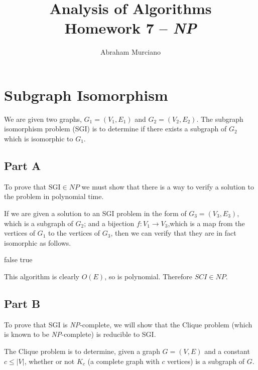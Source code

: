 \documentclass{article}
\title{Analysis of Algorithms \\
\medskip
\large Homework 7 -- \textit{NP}}
\author{Abraham Murciano}
\begin{document}
\maketitle

\section{Subgraph Isomorphism}

We are given two graphs, \(G_1 = (V_1, E_1)\) and \(G_2 = (V_2, E_2)\). The subgraph isomorphism problem (SGI) is to determine if there exists a subgraph of \(G_2\) which is isomorphic to \(G_1\).

\subsection*{Part A}

To prove that \(\text{SGI} \in \mathit{NP}\) we must show that there is a way to verify a solution to the problem in polynomial time.

If we are given a solution to an SGI problem in the form of \(G_3 = (V_3, E_3)\), which is a subgraph of \(G_2\); and a bijection \(f : V_1 \to V_3\),which is a map from the vertices of \(G_1\) to the vertices of \(G_3\), then we can verify that they are in fact isomorphic as follows.

\begin{algorithm}
	\begin{algorithmic}
		\Return false
		\EndIf
		\EndFor
		\State \Return true
		\EndFunction
	\end{algorithmic}
\end{algorithm}

This algorithm is clearly \(O(E)\), so is polynomial. Therefore \(\mathit{SCI} \in \mathit{NP}\).

\subsection*{Part B}

To prove that SGI is \textit{NP}-complete, we will show that the Clique problem (which is known to be \textit{NP}-complete) is reducible to SGI.

The Clique problem is to determine, given a graph \(G = (V, E)\) and a constant \(c \leq |V|\), whether or not \(K_c\) (a complete graph with \(c\) vertices) is a subgraph of \(G\).
\end{document}
